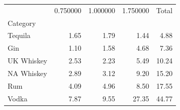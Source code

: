 \begin{tabular}{lrrrr}
\toprule
 & 0.750000 & 1.000000 & 1.750000 & Total \\
Category &  &  &  &  \\
\midrule
Tequila & 1.65 & 1.79 & 1.44 & 4.88 \\
Gin & 1.10 & 1.58 & 4.68 & 7.36 \\
UK Whiskey & 2.53 & 2.23 & 5.49 & 10.24 \\
NA Whiskey & 2.89 & 3.12 & 9.20 & 15.20 \\
Rum & 4.09 & 4.96 & 8.50 & 17.55 \\
Vodka & 7.87 & 9.55 & 27.35 & 44.77 \\
\bottomrule
\end{tabular}
